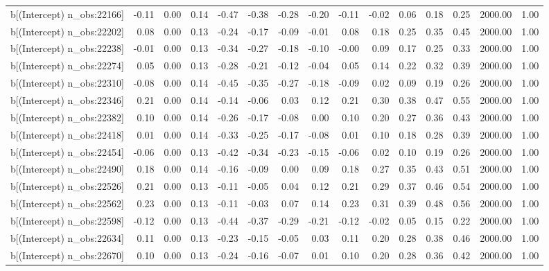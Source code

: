 \begin{table}[ht]
\begin{tabular}{rrrrrrrrrrrrrrr}
  b[(Intercept) n\_obs:22166] & -0.11 & 0.00 & 0.14 & -0.47 & -0.38 & -0.28 & -0.20 & -0.11 & -0.02 & 0.06 & 0.18 & 0.25 & 2000.00 & 1.00 \\ 
  b[(Intercept) n\_obs:22202] & 0.08 & 0.00 & 0.13 & -0.24 & -0.17 & -0.09 & -0.01 & 0.08 & 0.18 & 0.25 & 0.35 & 0.45 & 2000.00 & 1.00 \\ 
  b[(Intercept) n\_obs:22238] & -0.01 & 0.00 & 0.13 & -0.34 & -0.27 & -0.18 & -0.10 & -0.00 & 0.09 & 0.17 & 0.25 & 0.33 & 2000.00 & 1.00 \\ 
  b[(Intercept) n\_obs:22274] & 0.05 & 0.00 & 0.13 & -0.28 & -0.21 & -0.12 & -0.04 & 0.05 & 0.14 & 0.22 & 0.32 & 0.39 & 2000.00 & 1.00 \\ 
  b[(Intercept) n\_obs:22310] & -0.08 & 0.00 & 0.14 & -0.45 & -0.35 & -0.27 & -0.18 & -0.09 & 0.02 & 0.09 & 0.19 & 0.26 & 2000.00 & 1.00 \\ 
  b[(Intercept) n\_obs:22346] & 0.21 & 0.00 & 0.14 & -0.14 & -0.06 & 0.03 & 0.12 & 0.21 & 0.30 & 0.38 & 0.47 & 0.55 & 2000.00 & 1.00 \\ 
  b[(Intercept) n\_obs:22382] & 0.10 & 0.00 & 0.14 & -0.26 & -0.17 & -0.08 & 0.00 & 0.10 & 0.20 & 0.27 & 0.36 & 0.43 & 2000.00 & 1.00 \\ 
  b[(Intercept) n\_obs:22418] & 0.01 & 0.00 & 0.14 & -0.33 & -0.25 & -0.17 & -0.08 & 0.01 & 0.10 & 0.18 & 0.28 & 0.39 & 2000.00 & 1.00 \\ 
  b[(Intercept) n\_obs:22454] & -0.06 & 0.00 & 0.13 & -0.42 & -0.34 & -0.23 & -0.15 & -0.06 & 0.02 & 0.10 & 0.19 & 0.26 & 2000.00 & 1.00 \\ 
  b[(Intercept) n\_obs:22490] & 0.18 & 0.00 & 0.14 & -0.16 & -0.09 & 0.00 & 0.09 & 0.18 & 0.27 & 0.35 & 0.43 & 0.51 & 2000.00 & 1.00 \\ 
  b[(Intercept) n\_obs:22526] & 0.21 & 0.00 & 0.13 & -0.11 & -0.05 & 0.04 & 0.12 & 0.21 & 0.29 & 0.37 & 0.46 & 0.54 & 2000.00 & 1.00 \\ 
  b[(Intercept) n\_obs:22562] & 0.23 & 0.00 & 0.13 & -0.11 & -0.03 & 0.07 & 0.14 & 0.23 & 0.31 & 0.39 & 0.48 & 0.56 & 2000.00 & 1.00 \\ 
  b[(Intercept) n\_obs:22598] & -0.12 & 0.00 & 0.13 & -0.44 & -0.37 & -0.29 & -0.21 & -0.12 & -0.02 & 0.05 & 0.15 & 0.22 & 2000.00 & 1.00 \\ 
  b[(Intercept) n\_obs:22634] & 0.11 & 0.00 & 0.13 & -0.23 & -0.15 & -0.05 & 0.03 & 0.11 & 0.20 & 0.28 & 0.38 & 0.46 & 2000.00 & 1.00 \\ 
  b[(Intercept) n\_obs:22670] & 0.10 & 0.00 & 0.13 & -0.24 & -0.16 & -0.07 & 0.01 & 0.10 & 0.20 & 0.28 & 0.36 & 0.42 & 2000.00 & 1.00 \\ 

\end{tabular}
\end{table}
